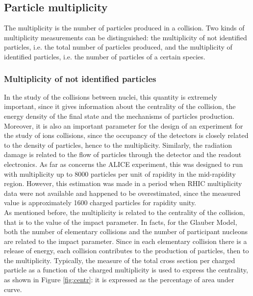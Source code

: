\subsection{Particle multiplicity}
The multiplicity is the number of particles produced in a collision. Two kinds of multiplicity measurements can be distinguished: the multiplicity of not identified particles, i.e. the total number of particles produced, and the multiplicity of identified particles, i.e. the number of particles of a certain species.
\subsubsection{Multiplicity of not identified particles}
In the study of the collisions between nuclei, this quantity is extremely important, since it gives information about the centrality of the collision, the energy density of the final state and the mechanisms of particles production. Moreover, it is also an important parameter for the design of an experiment for the study of ions collisions, since the occupancy of the detectors is closely related to the density of particles, hence to the multiplicity. Similarly, the radiation damage is related to the flow of particles through the detector and the readout electronics. As far as concerns the ALICE experiment, this was designed to run with multiplicity up to 8000 particles per unit of rapidity in the mid-rapidity region. However, this estimation was made in a period when RHIC multiplicity data were not available and happened to be overestimated, since the measured value is approximately 1600 charged particles for rapidity unity\cite{mult}.\\  
As mentioned before, the multiplicity is related to the centrality of the collision, that is to the value of the impact parameter. In facts, for the Glauber Model, both the number of elementary collisions and the number of participant nucleons are related to the impact parameter. Since in each elementary collision there is a release of energy, each collision contributes to the production of particles, then to the multiplicity. Typically, the measure of the total cross section per charged particle as a function of the charged multiplicity is used to express the centrality, as shown in Figure \ref{fig:centr}: it is expressed as the percentage of area under curve.\\
%
